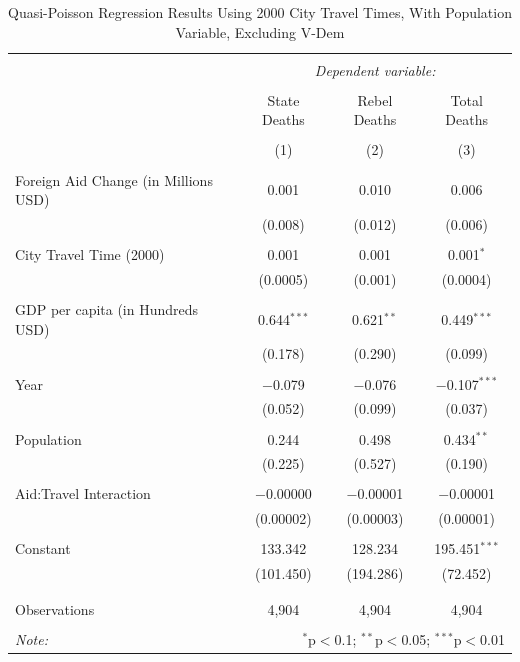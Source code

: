 \documentclass[12pt, letterpaper]{article}
\begin{document}
\begin{table}[!htbp] \centering 
	\caption{Quasi-Poisson Regression Results Using 2000 City Travel Times, With Population Variable, Excluding V-Dem } 
	\label{robustyearly2000pop} 
	\begin{tabular}{@{\extracolsep{5pt}}lccc} 
		\\[-1.8ex]\hline 
		\hline \\[-1.8ex] 
		& \multicolumn{3}{c}{\textit{Dependent variable:}} \\ 
		\cline{2-4} 
		\\[-1.8ex] & State Deaths & Rebel Deaths & Total Deaths \\ 
		\\[-1.8ex] & (1) & (2) & (3)\\ 
		\hline \\[-1.8ex] 
		Foreign Aid Change (in Millions USD) & 0.001 & 0.010 & 0.006 \\ 
		& (0.008) & (0.012) & (0.006) \\ 
		& & & \\ 
		City Travel Time (2000) & 0.001 & 0.001 & 0.001$^{*}$ \\ 
		& (0.0005) & (0.001) & (0.0004) \\ 
		& & & \\ 
		GDP per capita (in Hundreds USD) & 0.644$^{***}$ & 0.621$^{**}$ & 0.449$^{***}$ \\ 
		& (0.178) & (0.290) & (0.099) \\ 
		& & & \\ 
		Year & $-$0.079 & $-$0.076 & $-$0.107$^{***}$ \\ 
		& (0.052) & (0.099) & (0.037) \\ 
		& & & \\ 
		Population & 0.244 & 0.498 & 0.434$^{**}$ \\ 
		& (0.225) & (0.527) & (0.190) \\ 
		& & & \\ 
		Aid:Travel Interaction & $-$0.00000 & $-$0.00001 & $-$0.00001 \\ 
		& (0.00002) & (0.00003) & (0.00001) \\ 
		& & & \\ 
		Constant & 133.342 & 128.234 & 195.451$^{***}$ \\ 
		& (101.450) & (194.286) & (72.452) \\ 
		& & & \\ 
		\hline \\[-1.8ex] 
		Observations & 4,904 & 4,904 & 4,904 \\ 
		\hline 
		\hline \\[-1.8ex] 
		\textit{Note:}  & \multicolumn{3}{r}{$^{*}$p$<$0.1; $^{**}$p$<$0.05; $^{***}$p$<$0.01} \\ 
	\end{tabular} 
\end{table} 
\end{document}
